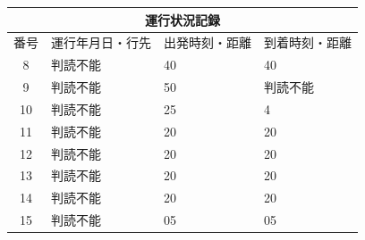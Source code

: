 \documentclass[UTF8,10pt,a4paper,fontset=fandol]{ctexart}
\newcommand{\fieldvalue}[1]{#1}
\newcommand{\handwritten}[1]{#1}
\begin{document}
\begin{tabularx}{\textwidth}{|c|X|X|X|}
\hline
\multicolumn{4}{|c|}{運行状況記録} \\
\hline
番号 & 運行年月日・行先 & 出発時刻・距離 & 到着時刻・距離 \\
\hline
8 &
\fieldvalue{\handwritten{判読不能}} &
\fieldvalue{\handwritten{40}} &
\fieldvalue{\handwritten{40}} \\
\hline
9 &
\fieldvalue{\handwritten{判読不能}} &
\fieldvalue{\handwritten{50}} &
\fieldvalue{\handwritten{判読不能}} \\
\hline
10 &
\fieldvalue{\handwritten{判読不能}} &
\fieldvalue{\handwritten{25}} &
\fieldvalue{\handwritten{4}} \\
\hline
11 &
\fieldvalue{\handwritten{判読不能}} &
\fieldvalue{\handwritten{20}} &
\fieldvalue{\handwritten{20}} \\
\hline
12 &
\fieldvalue{\handwritten{判読不能}} &
\fieldvalue{\handwritten{20}} &
\fieldvalue{\handwritten{20}} \\
\hline
13 &
\fieldvalue{\handwritten{判読不能}} &
\fieldvalue{\handwritten{20}} &
\fieldvalue{\handwritten{20}} \\
\hline
14 &
\fieldvalue{\handwritten{判読不能}} &
\fieldvalue{\handwritten{20}} &
\fieldvalue{\handwritten{20}} \\
\hline
15 &
\fieldvalue{\handwritten{判読不能}} &
\fieldvalue{\handwritten{05}} &
\fieldvalue{\handwritten{05}} \\
\hline
\end{tabularx}
\end{document}
